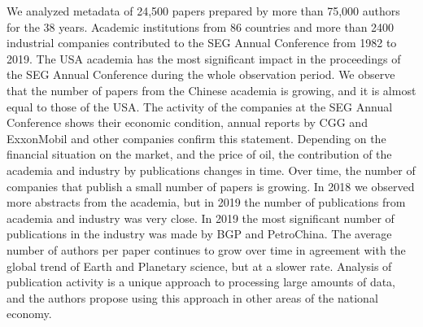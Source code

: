\documentclass[energies,article,submit,moreauthors,pdftex]{Definitions/mdpi}
\begin{document}
We analyzed metadata of 24,500 papers prepared by more than 75,000 authors for     the 38 years. Academic institutions from 86 countries and more than 2400 industrial companies contributed to the SEG Annual Conference from 1982 to 2019. The USA academia has the most significant impact in the proceedings of the SEG Annual Conference during the whole observation period. We observe that the number of papers from the Chinese academia is growing, and it is almost equal to those of the USA. The activity of the companies at the SEG Annual Conference shows their economic condition, annual reports by CGG and ExxonMobil and other companies confirm this statement. Depending on the financial situation on the market, and the price of oil, the contribution of the academia and industry by publications changes in time. Over time, the number of companies that publish a small number of papers is growing. In 2018 we observed more abstracts from the academia, but in 2019 the number of publications from academia and industry was very close. In 2019 the most significant number of publications in the industry was made by BGP and PetroChina. The average number of authors per paper continues to grow over time in agreement with the global trend of Earth and Planetary science, but at a slower rate. Analysis of publication activity is a unique approach to processing large amounts of data, and the authors propose using this approach in other areas of the national economy.


\vspace{6pt} 



\end{document}
